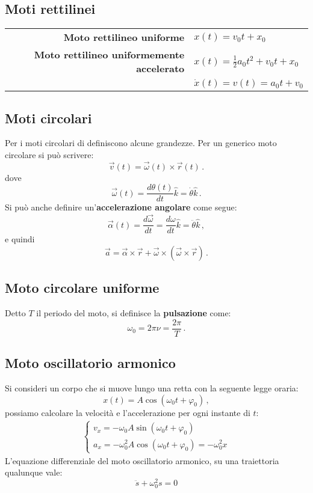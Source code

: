 \documentclass{article}
\begin{document}
\subsection{Moti rettilinei}
\begin{center}
\begin{tabular}{r l}
\textbf{Moto rettilineo uniforme} & $x(t)=v_0 t+x_0$\\[12pt]
\textbf{Moto rettilineo uniformemente accelerato} & $x(t)=\frac{1}{2}a_0 t^2 + v_0 t +x_0$\\
& $\dot{x}(t)=v(t)=a_0 t + v_0$\\
\end{tabular}
\end{center}

\subsection{Moti circolari}
Per i moti circolari di definiscono alcune grandezze. Per un generico moto circolare si può scrivere:
\[\vec{v}(t)=\vec{\omega}(t)\times\vec{r}(t)\,.\]
dove
\[\vec{\omega}(t)=\frac{d\theta (t)}{dt}\hat{k}=\dot{\theta}\hat{k}\,.\]
Si può anche definire un'\textbf{accelerazione angolare} come segue:
\[\vec{\alpha}(t)=\frac{d\vec{\omega}}{dt}=\frac{d\omega}{dt}\hat{k}=\ddot{\theta}\hat{k}\,,\]
e quindi
\[\vec{a}=\vec{\alpha}\times\vec{r}+\vec{\omega}\times(\vec{\omega}\times\vec{r})\,.\]
\bigskip
\subsection{Moto circolare uniforme}
Detto $T$ il periodo del moto, si definisce la \textbf{pulsazione} come:
\[\omega_0=2\pi\nu=\dfrac{2\pi}{T}\,.\]
\subsection{Moto oscillatorio armonico}
Si consideri un corpo che si muove lungo una retta con la seguente legge oraria:
\[x(t)=A\cos(\omega_0 t+\varphi_0)\,,\]
possiamo calcolare la velocità e l'accelerazione per ogni instante di $t$:
\begin{align*}
\begin{cases}
v_x=-\omega_0 A \sin(\omega_0 t + \varphi_0)\\
a_x=-\omega_0^2 A \cos(\omega_0 t + \varphi_0)=-\omega_0^2x
\end{cases}
\end{align*}
L'equazione differenziale del moto oscillatorio armonico, su una traiettoria qualunque vale:
\[\ddot{s}+\omega_0^2s=0\]
\end{document}
